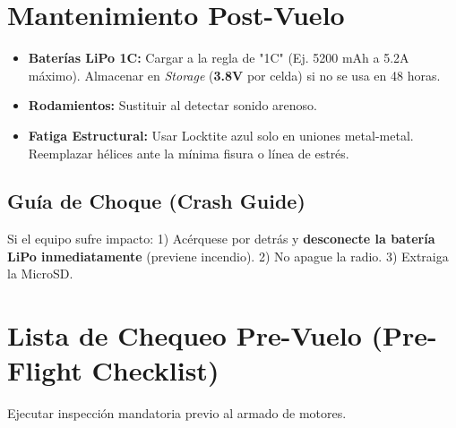 \documentclass[11pt,a4paper]{article}
\begin{document}
\section{Mantenimiento Post-Vuelo}
\begin{itemize}[leftmargin=*,noitemsep]
    \item \textbf{Baterías LiPo 1C:} Cargar a la regla de "1C" (Ej. 5200 mAh a 5.2A máximo). Almacenar en \textit{Storage} (\textbf{3.8V} por celda) si no se usa en 48 horas.
    \item \textbf{Rodamientos:} Sustituir al detectar sonido arenoso.
    \item \textbf{Fatiga Estructural:} Usar Locktite azul solo en uniones metal-metal. Reemplazar hélices ante la mínima fisura o línea de estrés.
\end{itemize}

\subsection{Guía de Choque (Crash Guide)}
Si el equipo sufre impacto: 1) Acérquese por detrás y \textbf{desconecte la batería LiPo inmediatamente} (previene incendio). 2) No apague la radio. 3) Extraiga la MicroSD.

\onecolumn
\newpage
\section*{Lista de Chequeo Pre-Vuelo (Pre-Flight Checklist)}
Ejecutar inspección mandatoria previo al armado de motores. \vspace{0.5cm}
\end{document}
